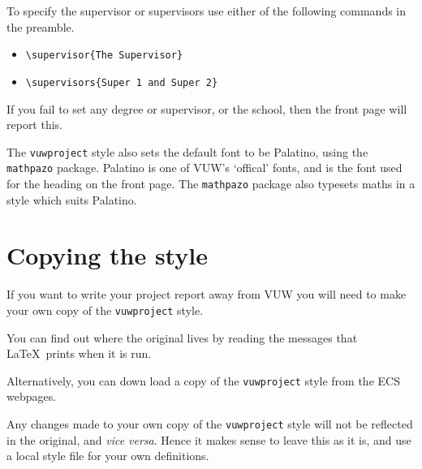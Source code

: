 To specify the supervisor or supervisors use either of the following commands in the preamble.
\begin{itemize}
\item \verb+\supervisor{The Supervisor}+
\item \verb+\supervisors{Super 1 and Super 2}+
\end{itemize}

If you fail to set any degree or supervisor, or the school, then the front page will report this.

The \texttt{vuwproject} style also sets the default font to be Palatino, using the \texttt{mathpazo} package. Palatino is one of VUW's `offical' fonts, and is the font used for the heading on the front page. The \texttt{mathpazo} package also typesets maths in a style which suits Palatino. 

\section{Copying the style}
If you want to write your project report away from VUW you will need to make your own copy of the \texttt{vuwproject} style.

You can find out where the original lives by reading the messages that \LaTeX\ prints when it is run.

Alternatively, you can down load a copy of the  \texttt{vuwproject} style from
the ECS webpages.

Any changes made to your own copy of the \texttt{vuwproject} style will not be reflected in the original, and \textit{vice versa}. Hence it makes sense to leave this as it is, and use a local style file for your own definitions.   
